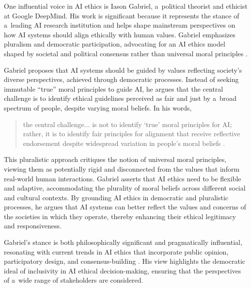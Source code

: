 \documentclass[%
  manuscript=article,
  year=2024,
  volume=77,
  doi=10.59203/zfn.77.707,
]{zfn}
\begin{document}
One influential voice in AI ethics is Iason Gabriel, a~political theorist and ethicist at Google DeepMind. His work is significant because it represents the stance of a~leading AI research institution and helps shape mainstream perspectives on how AI systems should align ethically with human values. Gabriel emphasizes pluralism and democratic participation, advocating for an AI ethics model shaped by societal and political consensus rather than universal moral principles 
\parencite[][]{gabriel_artificial_2020}.%




Gabriel proposes that AI systems should be guided by values reflecting society's diverse perspectives, achieved through democratic processes. Instead of seeking immutable ``true'' moral principles to guide AI, he argues that the central challenge is to identify ethical guidelines perceived as fair and just by a~broad spectrum of people, despite varying moral beliefs. In his words,



\begin{quote}
the central challenge... is not to identify ‘true' moral principles for AI; rather, it is to identify fair principles for alignment that receive reflective endorsement despite widespread variation in people's moral beliefs 
\parencite[][p.411]{gabriel_artificial_2020}.%
\end{quote}




This pluralistic approach critiques the notion of universal moral principles, viewing them as potentially rigid and disconnected from the values that inform real-world human interactions. Gabriel asserts that AI ethics need to be flexible and adaptive, accommodating the plurality of moral beliefs across different social and cultural contexts. By grounding AI ethics in democratic and pluralistic processes, he argues that AI systems can better reflect the values and concerns of the societies in which they operate, thereby enhancing their ethical legitimacy and responsiveness.



Gabriel's stance is both philosophically significant and pragmatically influential, resonating with current trends in AI ethics that incorporate public opinion, participatory design, and consensus-building 
\parencite[][]{world_economic_forum_ai_2024}. %
 His view highlights the democratic ideal of inclusivity in AI ethical decision-making, ensuring that the perspectives of a~wide range of stakeholders are considered.
\end{document}
